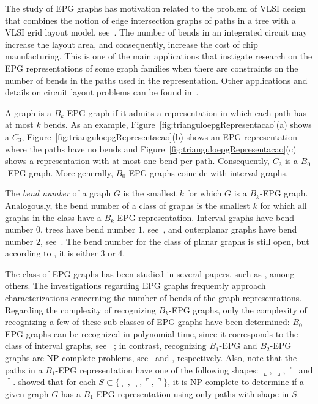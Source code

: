 The study of EPG graphs has motivation related to the problem of VLSI design that combines the notion of edge intersection graphs of paths in a  tree with a  VLSI  grid layout model, see~\cite{golumbic2009}. The number of bends in an integrated circuit may increase the layout area, and consequently, increase the cost of chip manufacturing.
This is one of the main applications that instigate research on the EPG representations of some graph families when there are constraints on the number of bends in the paths used in the representation.
Other applications and details on circuit layout problems can be found in~\cite{bandy1990, molitor1991}.

A graph is a $ B_k$-EPG graph if it admits a representation in which each path has at most $k$ bends. As an example, Figure~\ref{fig:trianguloepgRepresentacao}(a) shows a $C_3$, Figure~\ref{fig:trianguloepgRepresentacao}(b) shows an EPG representation where the paths have no bends and Figure~\ref{fig:trianguloepgRepresentacao}(c) shows a representation with at most one bend per path.   
Consequently, $C_3$ is a $B_0$-EPG graph. More generally, $B_0$-EPG graphs coincide with interval graphs.



The \emph{bend number} of a graph $G$ is the smallest $k$ for which $G$ is a $B_k$-EPG graph. Analogously, the bend number of a class of graphs is the smallest $k$ for which all graphs in the class have a $B_k$-EPG representation. Interval graphs have bend number $0$, trees have bend number $1$, see~\cite{golumbic2009}, and outerplanar graphs have bend number $2$, see~\cite{daniel2014b}. The bend number for the class of planar graphs is still open, but according to \cite{daniel2014b}, it is either $3$ or $4$.

The class of EPG graphs has been studied in several papers, such as \cite{alcon2016, Asinowski2009, cohen2014, golumbic2009, heldt2014,  martin2017,golumbic2019edge}, among others. The investigations regarding EPG graphs frequently approach characterizations concerning the number of bends of the graph representations. Regarding the complexity of recognizing $B_k$-EPG graphs, only the complexity of recognizing a few of these sub-classes of EPG graphs have been determined: $B_0$-EPG graphs can be recognized in polynomial time, since it corresponds to the class of interval graphs, see ~\cite{booth1976}; in contrast, recognizing $B_1$-EPG and $B_2$-EPG graphs are NP-complete problems, see~\cite{heldt2014} and \cite{martin2017}, respectively. 
Also, note that the paths in a $B_1$-EPG representation have one of the following shapes: $\llcorner$, $\lrcorner$, $\ulcorner$ and $\urcorner$. \cite{cameron2016edge} showed that for each $S\subset \{\llcorner, \lrcorner, \ulcorner, \urcorner\}$, it is NP-complete to determine if a given graph $G$ has a $B_1$-EPG representation using only paths with shape in $S$.


